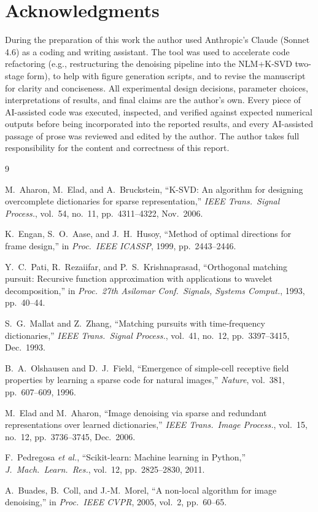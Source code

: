 \documentclass[conference]{IEEEtran}
\begin{document}
\section*{Acknowledgments}
During the preparation of this work the author used
Anthropic's Claude (Sonnet 4.6) as a coding and writing
assistant.  The tool was used to accelerate code refactoring
(e.g., restructuring the denoising pipeline into the
NLM+K-SVD two-stage form), to help with figure generation
scripts, and to revise the manuscript for clarity and
conciseness.  All experimental design decisions, parameter
choices, interpretations of results, and final claims are the
author's own.  Every piece of AI-assisted code was executed,
inspected, and verified against expected numerical outputs
before being incorporated into the reported results, and every
AI-assisted passage of prose was reviewed and edited by the
author.  The author takes full responsibility for the content
and correctness of this report.

\begin{thebibliography}{9}

M.~Aharon, M.~Elad, and A.~Bruckstein,
``{K-SVD}: An algorithm for designing overcomplete dictionaries
  for sparse representation,''
\emph{IEEE Trans.\ Signal Process.},
vol.~54, no.~11, pp.~4311--4322, Nov.~2006.

K.~Engan, S.~O.~Aase, and J.~H.~Husoy,
``Method of optimal directions for frame design,''
in \emph{Proc.\ IEEE ICASSP}, 1999, pp.~2443--2446.

Y.~C.~Pati, R.~Rezaiifar, and P.~S.~Krishnaprasad,
``Orthogonal matching pursuit: Recursive function approximation
  with applications to wavelet decomposition,''
in \emph{Proc.\ 27th Asilomar Conf.\ Signals, Systems Comput.},
1993, pp.~40--44.

S.~G.~Mallat and Z.~Zhang,
``Matching pursuits with time-frequency dictionaries,''
\emph{IEEE Trans.\ Signal Process.},
vol.~41, no.~12, pp.~3397--3415, Dec.~1993.

B.~A.~Olshausen and D.~J.~Field,
``Emergence of simple-cell receptive field properties by learning
  a sparse code for natural images,''
\emph{Nature}, vol.~381, pp.~607--609, 1996.

M.~Elad and M.~Aharon,
``Image denoising via sparse and redundant representations over
  learned dictionaries,''
\emph{IEEE Trans.\ Image Process.},
vol.~15, no.~12, pp.~3736--3745, Dec.~2006.

F.~Pedregosa \emph{et al.},
``Scikit-learn: Machine learning in {Python},''
\emph{J.\ Mach.\ Learn.\ Res.}, vol.~12, pp.~2825--2830, 2011.

A.~Buades, B.~Coll, and J.-M.~Morel,
``A non-local algorithm for image denoising,''
in \emph{Proc.\ IEEE CVPR}, 2005, vol.~2, pp.~60--65.

\end{thebibliography}
\end{document}
